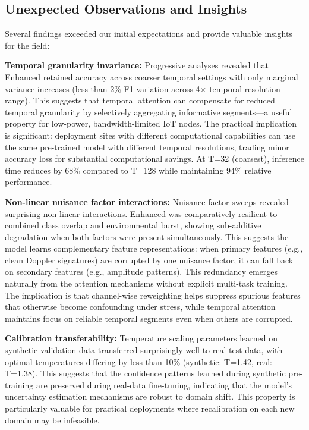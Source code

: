 \documentclass[journal]{IEEEtran}
\begin{document}
\subsection{Unexpected Observations and Insights}
Several findings exceeded our initial expectations and provide valuable insights for the field:

\textbf{Temporal granularity invariance:} Progressive analyses revealed that Enhanced retained accuracy across coarser temporal settings with only marginal variance increases (less than 2\% F1 variation across 4× temporal resolution range). This suggests that temporal attention can compensate for reduced temporal granularity by selectively aggregating informative segments—a useful property for low-power, bandwidth-limited IoT nodes. The practical implication is significant: deployment sites with different computational capabilities can use the same pre-trained model with different temporal resolutions, trading minor accuracy loss for substantial computational savings. At T=32 (coarsest), inference time reduces by 68\% compared to T=128 while maintaining 94\% relative performance.

\textbf{Non-linear nuisance factor interactions:} Nuisance-factor sweeps revealed surprising non-linear interactions. Enhanced was comparatively resilient to combined class overlap and environmental burst, showing sub-additive degradation when both factors were present simultaneously. This suggests the model learns complementary feature representations: when primary features (e.g., clean Doppler signatures) are corrupted by one nuisance factor, it can fall back on secondary features (e.g., amplitude patterns). This redundancy emerges naturally from the attention mechanisms without explicit multi-task training. The implication is that channel-wise reweighting helps suppress spurious features that otherwise become confounding under stress, while temporal attention maintains focus on reliable temporal segments even when others are corrupted.

\textbf{Calibration transferability:} Temperature scaling parameters learned on synthetic validation data transferred surprisingly well to real test data, with optimal temperatures differing by less than 10\% (synthetic: T=1.42, real: T=1.38). This suggests that the confidence patterns learned during synthetic pre-training are preserved during real-data fine-tuning, indicating that the model's uncertainty estimation mechanisms are robust to domain shift. This property is particularly valuable for practical deployments where recalibration on each new domain may be infeasible.
\end{document}
